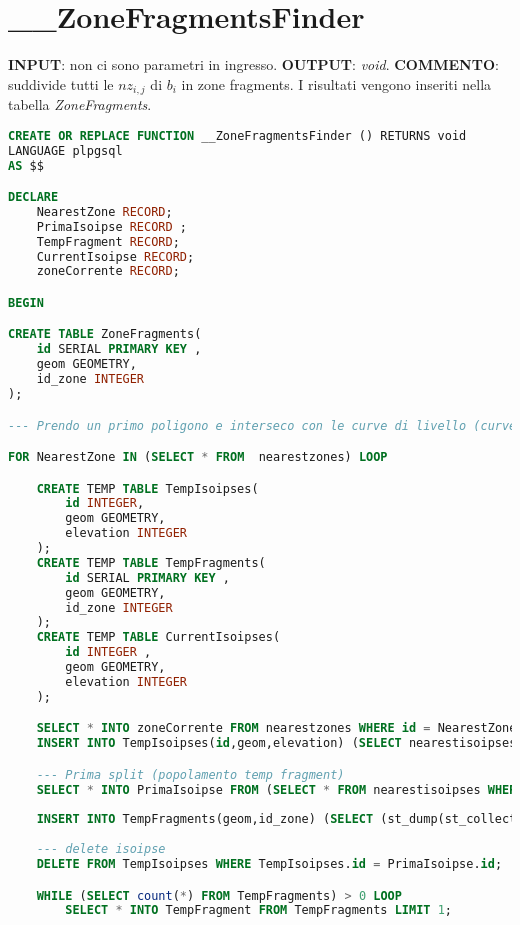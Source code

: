 \section{\_\_ZoneFragmentsFinder}
\textbf{INPUT}: non ci sono parametri in ingresso. \newline
\textbf{OUTPUT}: \textit{void}. \newline
\textbf{COMMENTO}: suddivide tutti le $nz_{i,j}$ di $b_i$ in zone fragments. I risultati vengono inseriti nella tabella \textit{ZoneFragments}.

\begin{lstlisting}[language=SQL]
CREATE OR REPLACE FUNCTION __ZoneFragmentsFinder () RETURNS void
LANGUAGE plpgsql
AS $$

DECLARE
	NearestZone RECORD;
	PrimaIsoipse RECORD ;
	TempFragment RECORD;
	CurrentIsoipse RECORD;
	zoneCorrente RECORD;

BEGIN

CREATE TABLE ZoneFragments(
	id SERIAL PRIMARY KEY ,
	geom GEOMETRY,
	id_zone INTEGER
);

--- Prendo un primo poligono e interseco con le curve di livello (curve risultanti dall'intersezione con il buffer)

FOR NearestZone IN (SELECT * FROM  nearestzones) LOOP

	CREATE TEMP TABLE TempIsoipses(
		id INTEGER,
		geom GEOMETRY,
		elevation INTEGER
	);
	CREATE TEMP TABLE TempFragments(
		id SERIAL PRIMARY KEY ,
		geom GEOMETRY,
		id_zone INTEGER
	);
	CREATE TEMP TABLE CurrentIsoipses(
		id INTEGER ,
		geom GEOMETRY,
		elevation INTEGER
	);

	SELECT * INTO zoneCorrente FROM nearestzones WHERE id = NearestZone.id;
	INSERT INTO TempIsoipses(id,geom,elevation) (SELECT nearestisoipses.id,(st_dump(st_collectionextract(st_intersection(nearestisoipses.geom,zoneCorrente.geom),2))).geom as geom,nearestisoipses.elevation FROM nearestisoipses);

	--- Prima split (popolamento temp fragment)
	SELECT * INTO PrimaIsoipse FROM (SELECT * FROM nearestisoipses WHERE (SELECT id From TempIsoipses LIMIT 1) = nearestisoipses.id) as prima;
	
	INSERT INTO TempFragments(geom,id_zone) (SELECT (st_dump(st_collectionextract(st_split(zoneCorrente.geom,PrimaIsoipse.geom),3))).geom , zoneCorrente.id);
	
	--- delete isoipse
	DELETE FROM TempIsoipses WHERE TempIsoipses.id = PrimaIsoipse.id;

	WHILE (SELECT count(*) FROM TempFragments) > 0 LOOP
		SELECT * INTO TempFragment FROM TempFragments LIMIT 1;
		

\end{lstlisting}
